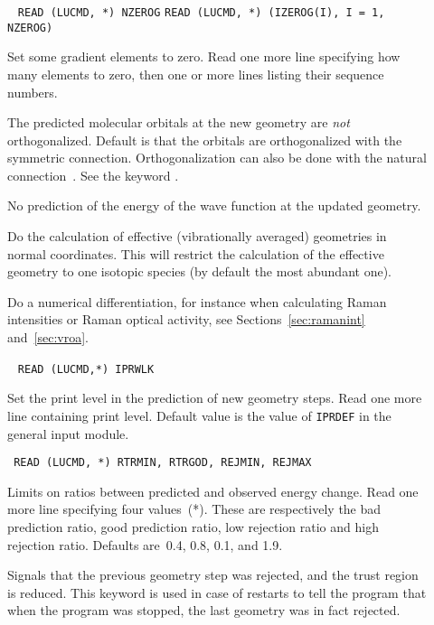 \begin{description}
\item[]\verb| |\newline
\verb|READ (LUCMD, *) NZEROG|\newline
\verb|READ (LUCMD, *) (IZEROG(I), I = 1, NZEROG)|

 Set some gradient elements  to zero.  Read
one more line specifying how many elements to zero, then one
or more lines listing their sequence numbers.

\item[] The predicted molecular orbitals at the new
geometry are {\em not} orthogonalized. Default is that the orbitals
are orthogonalized with the symmetric connection. Orthogonalization
can also be done with the natural
connection~\cite{joklbkrthpjtca90}. See the keyword .

\item[] No prediction of the energy of the wave function
at the updated geometry.

\item[] Do the calculation of effective (vibrationally
averaged) geometries in normal coordinates. This will restrict the
calculation of the effective geometry to one isotopic species (by
default the most abundant one).

\item[] Do a numerical
differentiation, for instance when
calculating Raman intensities or Raman optical activity, see
Sections~\ref{sec:ramanint} and~\ref{sec:vroa}.

\item[]\verb| |\newline
\verb|READ (LUCMD,*) IPRWLK|

Set the print level in the prediction of new geometry steps.  Read one
more line containing print level. Default value is the value of
\verb|IPRDEF| in the general input module.

\item[]\verb| |\newline
\verb|READ (LUCMD, *) RTRMIN, RTRGOD, REJMIN, REJMAX|

Limits on ratios between predicted and
observed energy change.  Read one more line specifying four
values~(*).  These are respectively the bad prediction ratio, good
prediction ratio, low rejection ratio and high rejection ratio.
Defaults are~0.4, 0.8, 0.1, and 1.9.

\item[] Signals that the previous geometry step was
rejected, and the trust
region is
reduced. This keyword is
used in case of restarts to tell the program that when the program
was stopped, the last geometry was in fact rejected.


\end{description}
